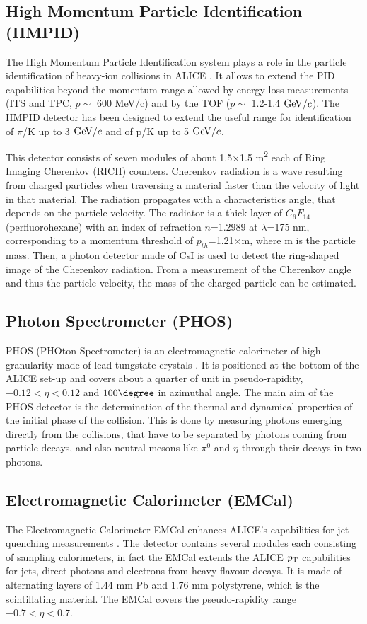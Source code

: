 \subsection{High Momentum Particle Identification (HMPID)}
The High Momentum Particle Identification system plays a role in the particle
 identification of heavy-ion collisions in ALICE \cite{HMPID-TDR}. It allows to extend
  the PID capabilities beyond the momentum range allowed by energy loss measurements 
  (ITS and TPC, $p \sim$ 600 MeV/c) and by the TOF ($p \sim$ 1.2-1.4 $\mathrm{GeV}/c$). 
  The HMPID detector has been designed to extend the useful range for identification of 
  $\pi$/K up to 3 $\mathrm{GeV}/c$ and of p/K up to 5 $\mathrm{GeV}/c$. 


This detector consists of seven modules of about 1.5$\times$1.5 m\textsuperscript{2} 
each of Ring Imaging Cherenkov (RICH) counters. Cherenkov radiation is a wave resulting
 from charged particles when traversing a material faster than the velocity of light in that 
 material. The radiation propagates with a characteristics angle, that depends on the particle 
 velocity. The radiator is a thick layer of $C_6F_{14}$ (perfluorohexane) with an index of 
 refraction $n$=1.2989 at $\lambda$=175 nm, corresponding to a momentum threshold 
 of $p_{th}$=1.21$\times$m, where m is the particle mass. Then, a photon detector made 
 of CsI is used to detect the ring-shaped image of the Cherenkov radiation. From a 
 measurement of the Cherenkov angle and thus the particle velocity, the mass of the charged particle can be estimated.

\subsection{Photon Spectrometer (PHOS)}
PHOS (PHOton Spectrometer) is an electromagnetic calorimeter of high granularity 
made of lead tungstate crystals \cite{PHOS-TDR}. It is positioned at the bottom of the 
ALICE set-up and covers about a quarter of unit in pseudo-rapidity, $-0.12<\eta<0.12$ and $100\degree$ 
in azimuthal angle. The main aim of the PHOS detector is the determination of the 
thermal and dynamical properties of the initial phase of the collision. This is done 
by measuring photons emerging directly from the collisions, that have to be 
separated by photons coming from particle decays, and also neutral mesons like 
$\pi^0$ and $\eta$ through their decays in two photons.

\subsection{Electromagnetic Calorimeter (EMCal)}
The Electromagnetic Calorimeter EMCal enhances ALICE's capabilities for jet 
quenching measurements \cite{EMCal-TDR}.
The detector contains several modules each consisting of sampling calorimeters,
 in fact the EMCal extends the ALICE $p_{\rm T}$ capabilities for jets, direct photons and 
 electrons from heavy-flavour decays. It is made of alternating layers of 1.44 mm Pb 
 and 1.76 mm polystyrene, which is the scintillating material. The EMCal covers the
  pseudo-rapidity range $-0.7 < \eta < 0.7$.

